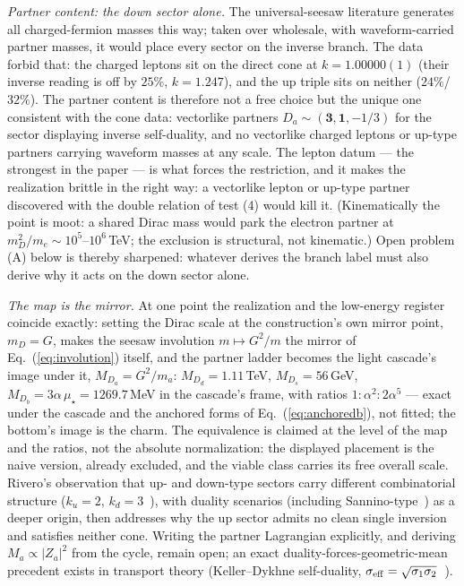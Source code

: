 \documentclass[11pt]{article}
\begin{document}
\emph{Partner content: the down sector alone.} The universal-seesaw
literature generates all charged-fermion masses this way; taken over
wholesale, with waveform-carried partner masses, it would place every sector
on the inverse branch. The data forbid that: the charged leptons sit on the
direct cone at $k = 1.00000(1)$ (their inverse reading is off by $25\%$,
$k = 1.247$), and the up triple sits on neither ($24\%$/$32\%$). The partner
content is therefore not a free choice but the unique one consistent with
the cone data: vectorlike partners $D_a \sim (\mathbf{3},\mathbf{1},-1/3)$
for the sector displaying inverse self-duality, and no vectorlike charged
leptons or up-type partners carrying waveform masses at any scale. The
lepton datum --- the strongest in the paper --- is what forces the
restriction, and it makes the realization brittle in the right way: a
vectorlike lepton or up-type partner discovered with the double relation of
test (4) would kill it. (Kinematically the point is moot: a shared Dirac
mass would park the electron partner at
$m_D^2/m_e \sim 10^{5}$--$10^{6}$\,TeV; the exclusion is structural, not
kinematic.) Open problem (A) below is thereby sharpened: whatever derives
the branch label must also derive why it acts on the down sector alone.

\emph{The map is the mirror.} At one point the realization and the low-energy
register coincide exactly: setting the Dirac scale at the construction's own
mirror point, $m_D = G$, makes the seesaw involution $m \mapsto G^2/m$ the
mirror of Eq.~(\ref{eq:involution}) itself, and the partner ladder becomes the
light cascade's image under it, $M_{D_a} = G^2/m_a$:
$M_{D_d} = 1.11$\,TeV, $M_{D_s} = 56$\,GeV,
$M_{D_b} = 3\alpha\,\mu_\star = 1269.7$\,MeV in the cascade's frame, with
ratios $1:\alpha^2:2\alpha^5$ --- exact under the cascade and the anchored
forms of Eq.~(\ref{eq:anchoredb}), not fitted; the bottom's image is the
charm. The equivalence is claimed at the level of the map and the ratios, not
the absolute normalization: the displayed placement is the naive version,
already excluded, and the viable class carries its free overall scale.
Rivero's observation that up- and down-type sectors carry different combinatorial structure ($k_u=2$, $k_d=3$~\cite{Rivero2024}), with duality scenarios (including Sannino-type~\cite{Sannino}) as a deeper origin, then addresses
why the up sector admits no clean single inversion and satisfies neither cone.
Writing the partner Lagrangian explicitly, and deriving $M_a \propto |Z_a|^2$
from the cycle, remain open; an exact duality-forces-geometric-mean precedent
exists in transport theory (Keller--Dykhne self-duality,
$\sigma_{\rm eff}=\sqrt{\sigma_1\sigma_2}$~\cite{Keller,Dykhne}).
\end{document}

